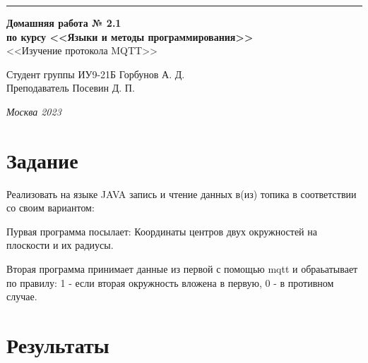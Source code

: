 \documentclass[a4paper, 14pt]{extarticle}
\begin{document}
\begin{titlepage}
\vspace*{-16pt}
\hspace{30pt}\rule{0.866\textwidth}{0.4pt}
  
\vspace{11em}

\begin{center}
\Large {\bf Домашняя работа № 2.1} \\ 
\large {\bf по курсу <<Языки и методы программирования>>} \\
\large <<Изучение протокола MQTT>> 
\end{center}\normalsize

\vspace{8em}


\begin{flushright}
  {Студент группы ИУ9-21Б Горбунов А. Д. \hspace*{15pt}\\ 
  \vspace{2ex}
  Преподаватель Посевин Д. П.\hspace*{15pt}}
\end{flushright}

\bigskip

\vfill
 

\begin{center}
\textsl{Москва 2023}
\end{center}
\end{titlepage}

\renewcommand{\ttdefault}{pcr}

\setlength{\tabcolsep}{3pt}
\newpage
\setcounter{page}{2}

\section{Задание}\label{Sect::task}
    Реализовать на языке JAVA запись и чтение данных в(из) топика в соответствии со своим вариантом:

    Пурвая программа посылает:
    Координаты центров двух окружностей на плоскости и их радиусы.

    Вторая программа принимает данные из первой с помощью mqtt и обраьатывает по правилу:
    1 - если вторая окружность вложена в первую, 0 - в противном случае.

\section{Результаты}\label{Sect::res}
\end{document}

